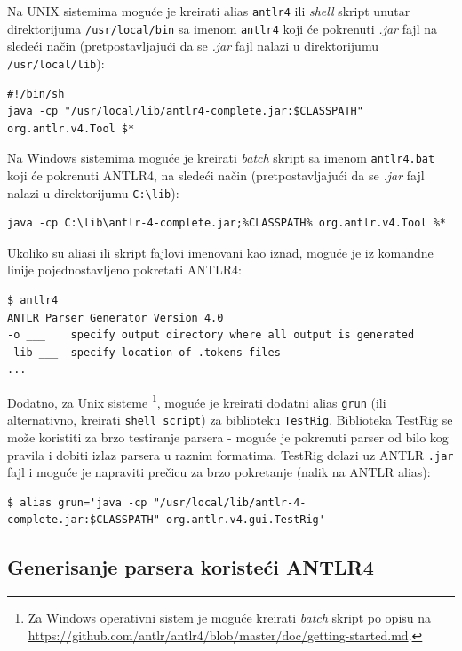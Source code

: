 Na UNIX sistemima moguće je kreirati alias \texttt{antlr4} ili \emph{shell} skript unutar direktorijuma \texttt{/usr/local/bin} sa imenom \texttt{antlr4} koji će pokrenuti \emph{.jar} fajl na sledeći način (pretpostavljajući da se \emph{.jar} fajl nalazi u direktorijumu \texttt{/usr/local/lib}):
\begin{lstlisting}[language={}]
#!/bin/sh
java -cp "/usr/local/lib/antlr4-complete.jar:$CLASSPATH" org.antlr.v4.Tool $*
\end{lstlisting}

Na Windows sistemima moguće je kreirati \emph{batch} skript sa imenom \texttt{antlr4.bat} koji će pokrenuti ANTLR4, na sledeći način (pretpostavljajući da se \emph{.jar} fajl nalazi u direktorijumu \texttt{C:\textbackslash{}lib}):
\begin{lstlisting}[language={}]
java -cp C:\lib\antlr-4-complete.jar;%CLASSPATH% org.antlr.v4.Tool %*
\end{lstlisting}

Ukoliko su aliasi ili skript fajlovi imenovani kao iznad, moguće je iz komandne linije pojednostavljeno pokretati ANTLR4:  
\begin{lstlisting}[language={}]
$ antlr4
ANTLR Parser Generator Version 4.0
-o ___    specify output directory where all output is generated
-lib ___  specify location of .tokens files
...
\end{lstlisting}

Dodatno, za Unix sisteme \footnote{Za Windows operativni sistem je moguće kreirati \emph{batch} skript po opisu na \url{https://github.com/antlr/antlr4/blob/master/doc/getting-started.md}.}, moguće je kreirati dodatni alias \texttt{grun} (ili alternativno, kreirati \texttt{shell script}) za biblioteku \texttt{TestRig}. Biblioteka TestRig se može koristiti za brzo testiranje parsera - moguće je pokrenuti parser od bilo kog pravila i dobiti izlaz parsera u raznim formatima. TestRig dolazi uz ANTLR \texttt{.jar} fajl i moguće je napraviti prečicu za brzo pokretanje (nalik na ANTLR alias):
\begin{lstlisting}[language={}]
$ alias grun='java -cp "/usr/local/lib/antlr-4-complete.jar:$CLASSPATH" org.antlr.v4.gui.TestRig'
\end{lstlisting}


\subsection{Generisanje parsera koristeći ANTLR4}
\label{subsec:ANTLRParserGeneration}

